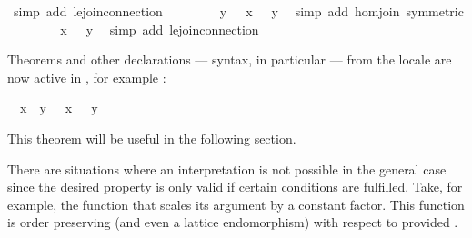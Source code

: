 \begin{isabellebody}
\ {\isacharparenleft}simp\ add{\isacharcolon}\ le{\isachardot}join{\isacharunderscore}connection{\isacharparenright}\isanewline
\ \ \ \ \isamarkupfalse%
\ \isamarkupfalse%
\ {\isachardoublequoteopen}{\isasymphi}\ y\ {\isacharequal}\ {\isacharparenleft}{\isasymphi}\ x\ {\isasymsqunion}{\isacharprime}\ {\isasymphi}\ y{\isacharparenright}{\isachardoublequoteclose}\ \isamarkupfalse%
\ {\isacharparenleft}simp\ add{\isacharcolon}\ hom{\isacharunderscore}join\ {\isacharbrackleft}symmetric{\isacharbrackright}{\isacharparenright}\isanewline
\ \ \ \ \isamarkupfalse%
\ \isamarkupfalse%
\ {\isachardoublequoteopen}{\isasymphi}\ x\ {\isasympreceq}\ {\isasymphi}\ y{\isachardoublequoteclose}\ \isamarkupfalse%
\ {\isacharparenleft}simp\ add{\isacharcolon}\ le{\isacharprime}{\isachardot}join{\isacharunderscore}connection{\isacharparenright}\isanewline
\ \ \isamarkupfalse%
%
\endisatagproof
{\isafoldproof}%
%
\isadelimproof
%
\endisadelimproof
%
\begin{isamarkuptext}%
Theorems and other declarations --- syntax, in particular --- from
  the locale  are now active in , for example
  :
  \begin{isabelle}%
\ \ {\isacharquery}x\ {\isasymsqsubseteq}\ {\isacharquery}y\ {\isasymLongrightarrow}\ {\isasymphi}\ {\isacharquery}x\ {\isasympreceq}\ {\isasymphi}\ {\isacharquery}y%
\end{isabelle}
  This theorem will be useful in the following section.%
\end{isamarkuptext}%
\isamarkuptrue%
%
\isamarkuptrue%
%
\begin{isamarkuptext}%
There are situations where an interpretation is not possible
  in the general case since the desired property is only valid if
  certain conditions are fulfilled.  Take, for example, the function
   that scales its argument by a constant factor.
  This function is order preserving (and even a lattice endomorphism)
  with respect to  provided .


\end{isamarkuptext}
\end{isabellebody}
